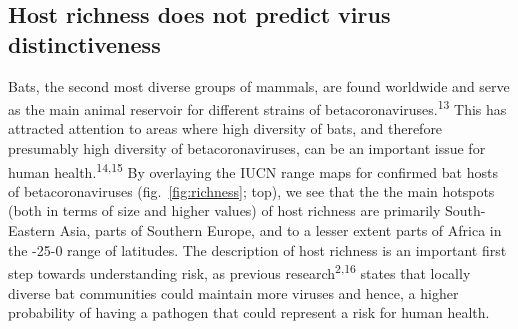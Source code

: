 \documentclass[10pt,oneside]{article}
\begin{document}
\hypertarget{host-richness-does-not-predict-virus-distinctiveness}{%
\subsection{Host richness does not predict virus
distinctiveness}\label{host-richness-does-not-predict-virus-distinctiveness}}

Bats, the second most diverse groups of mammals, are found worldwide and
serve as the main animal reservoir for different strains of
betacoronaviruses.\textsuperscript{13} This has attracted attention to
areas where high diversity of bats, and therefore presumably high
diversity of betacoronaviruses, can be an important issue for human
health.\textsuperscript{14,15} By overlaying the IUCN range maps for
confirmed bat hosts of betacoronaviruses (fig.~\ref{fig:richness}; top),
we see that the the main hotspots (both in terms of size and higher
values) of host richness are primarily South-Eastern Asia, parts of
Southern Europe, and to a lesser extent parts of Africa in the -25-0
range of latitudes. The description of host richness is an important
first step towards understanding risk, as previous
research\textsuperscript{2,16} states that locally diverse bat
communities could maintain more viruses and hence, a higher probability
of having a pathogen that could represent a risk for human health.
\end{document}
